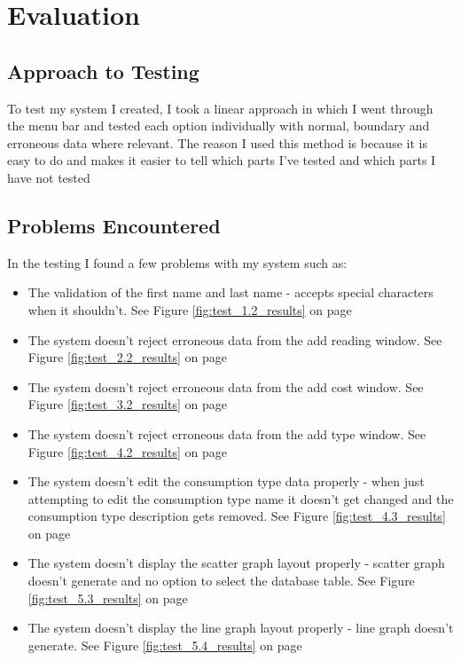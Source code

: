 \section{Evaluation}

\subsection{Approach to Testing}
To test my system I created, I took a linear approach in which I went through the menu bar and tested each option individually with normal, boundary and erroneous data where relevant. The reason I used this method is because it is easy to do and makes it easier to tell which parts I've tested and which parts I have not tested

\subsection{Problems Encountered}
In the testing I found a few problems with my system such as:
\begin{itemize}
	\item The validation of the first name and last name - accepts special characters when it shouldn't. See Figure \ref{fig:test_1.2_results} on page \pageref{fig:test_1.2_results}
	\item The system doesn't reject erroneous data from the add reading window. See Figure \ref{fig:test_2.2_results} on page \pageref{fig:test_2.2_results}
	\item The system doesn't reject erroneous data from the add cost window. See Figure \ref{fig:test_3.2_results} on page \pageref{fig:test_3.2_results}
	\item The system doesn't reject erroneous data from the add type window. See Figure \ref{fig:test_4.2_results} on page \pageref{fig:test_4.2_results}
	\item The system doesn't edit the consumption type data properly - when just attempting to edit the consumption type name it doesn't get changed and the consumption type description gets removed. See Figure \ref{fig:test_4.3_results} on page \pageref{fig:test_4.3_results}
	\item The system doesn't display the scatter graph layout properly - scatter graph doesn't generate and no option to select the database table. See Figure \ref{fig:test_5.3_results} on page \pageref{fig:test_5.3_results}
	\item The system doesn't display the line graph layout properly - line graph doesn't generate. See Figure \ref{fig:test_5.4_results} on page \pageref{fig:test_5.4_results}
\end{itemize}

